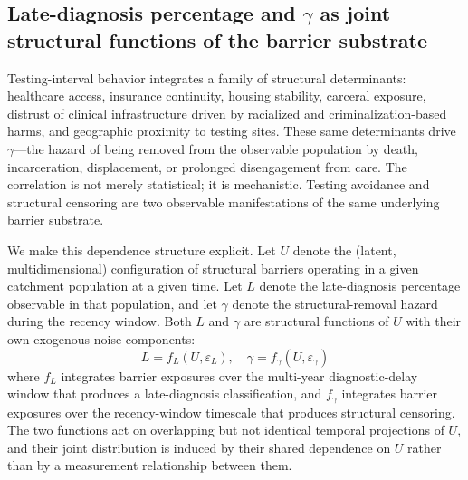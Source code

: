 \documentclass[12pt]{article}
\begin{document}
\subsection{Late-diagnosis percentage and \texorpdfstring{$\gamma$}{gamma} as joint structural functions of the barrier substrate}

Testing-interval behavior integrates a family of structural determinants: healthcare access, insurance continuity, housing stability, carceral exposure, distrust of clinical infrastructure driven by racialized and criminalization-based harms, and geographic proximity to testing sites. These same determinants drive $\gamma$---the hazard of being removed from the observable population by death, incarceration, displacement, or prolonged disengagement from care. The correlation is not merely statistical; it is mechanistic. Testing avoidance and structural censoring are two observable manifestations of the same underlying barrier substrate.

We make this dependence structure explicit. Let $U$ denote the (latent, multidimensional) configuration of structural barriers operating in a given catchment population at a given time. Let $L$ denote the late-diagnosis percentage observable in that population, and let $\gamma$ denote the structural-removal hazard during the recency window. Both $L$ and $\gamma$ are structural functions of $U$ with their own exogenous noise components:
\begin{equation}
L = f_L(U, \varepsilon_L), \quad \gamma = f_\gamma(U, \varepsilon_\gamma)
\end{equation}
where $f_L$ integrates barrier exposures over the multi-year diagnostic-delay window that produces a late-diagnosis classification, and $f_\gamma$ integrates barrier exposures over the recency-window timescale that produces structural censoring. The two functions act on overlapping but not identical temporal projections of $U$, and their joint distribution is induced by their shared dependence on $U$ rather than by a measurement relationship between them.
\end{document}
